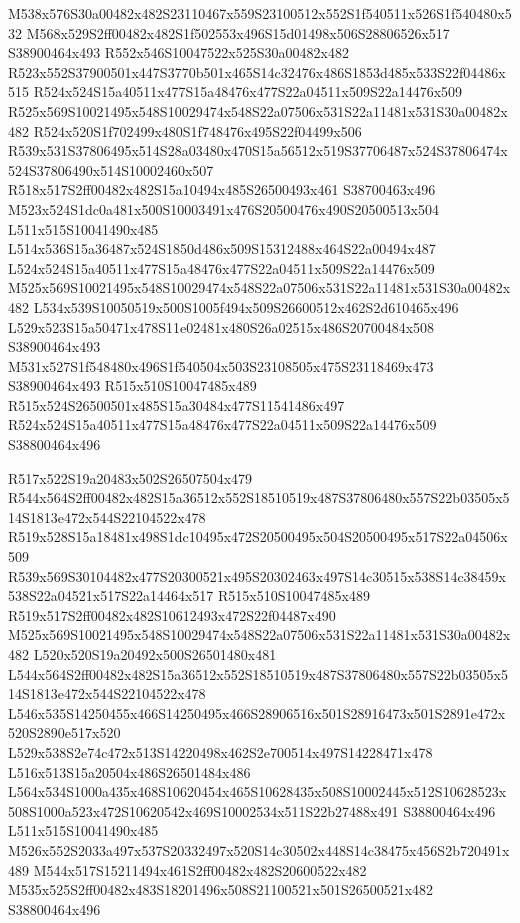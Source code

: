 \documentclass{article}
\begin{document}
\begin{multicols}{2}
M538x576S30a00482x482S23110467x559S23100512x552S1f540511x526S1f540480x532 M568x529S2ff00482x482S1f502553x496S15d01498x506S28806526x517 S38900464x493 R552x546S10047522x525S30a00482x482 R523x552S37900501x447S3770b501x465S14c32476x486S1853d485x533S22f04486x515 R524x524S15a40511x477S15a48476x477S22a04511x509S22a14476x509 R525x569S10021495x548S10029474x548S22a07506x531S22a11481x531S30a00482x482 R524x520S1f702499x480S1f748476x495S22f04499x506 R539x531S37806495x514S28a03480x470S15a56512x519S37706487x524S37806474x524S37806490x514S10002460x507 R518x517S2ff00482x482S15a10494x485S26500493x461 S38700463x496 M523x524S1dc0a481x500S10003491x476S20500476x490S20500513x504 L511x515S10041490x485 L514x536S15a36487x524S1850d486x509S15312488x464S22a00494x487 L524x524S15a40511x477S15a48476x477S22a04511x509S22a14476x509 M525x569S10021495x548S10029474x548S22a07506x531S22a11481x531S30a00482x482 L534x539S10050519x500S1005f494x509S26600512x462S2d610465x496 L529x523S15a50471x478S11e02481x480S26a02515x486S20700484x508 S38900464x493 M531x527S1f548480x496S1f540504x503S23108505x475S23118469x473 S38900464x493 R515x510S10047485x489 R515x524S26500501x485S15a30484x477S11541486x497 R524x524S15a40511x477S15a48476x477S22a04511x509S22a14476x509 S38800464x496

R517x522S19a20483x502S26507504x479 R544x564S2ff00482x482S15a36512x552S18510519x487S37806480x557S22b03505x514S1813e472x544S22104522x478 R519x528S15a18481x498S1dc10495x472S20500495x504S20500495x517S22a04506x509 R539x569S30104482x477S20300521x495S20302463x497S14c30515x538S14c38459x538S22a04521x517S22a14464x517 R515x510S10047485x489 R519x517S2ff00482x482S10612493x472S22f04487x490 M525x569S10021495x548S10029474x548S22a07506x531S22a11481x531S30a00482x482 L520x520S19a20492x500S26501480x481 L544x564S2ff00482x482S15a36512x552S18510519x487S37806480x557S22b03505x514S1813e472x544S22104522x478 L546x535S14250455x466S14250495x466S28906516x501S28916473x501S2891e472x520S2890e517x520 L529x538S2e74c472x513S14220498x462S2e700514x497S14228471x478 L516x513S15a20504x486S26501484x486 L564x534S1000a435x468S10620454x465S10628435x508S10002445x512S10628523x508S1000a523x472S10620542x469S10002534x511S22b27488x491 S38800464x496 L511x515S10041490x485 M526x552S2033a497x537S20332497x520S14c30502x448S14c38475x456S2b720491x489 M544x517S15211494x461S2ff00482x482S20600522x482 M535x525S2ff00482x483S18201496x508S21100521x501S26500521x482 S38800464x496


\end{multicols}
\end{document}
